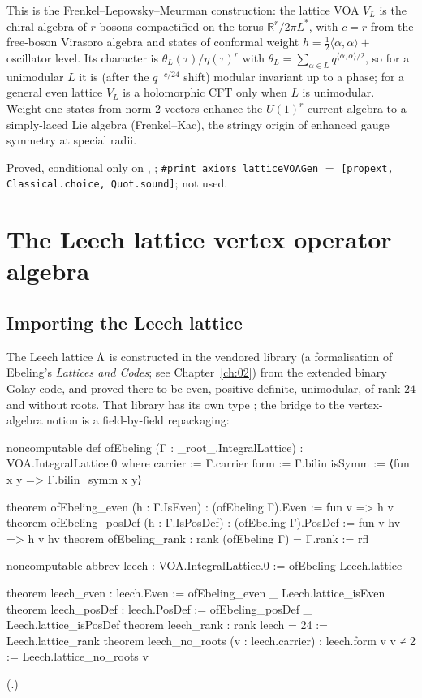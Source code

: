 \begin{physics}
This is the Frenkel--Lepowsky--Meurman construction: the lattice VOA $V_L$ is the chiral algebra of $r$ bosons compactified on the torus $\mathbb R^r/2\pi L^*$, with $c=r$ from the free-boson Virasoro algebra and states of conformal weight $h=\frac12\langle\alpha,\alpha\rangle+$ oscillator level. Its character is $\theta_L(\tau)/\eta(\tau)^r$ with $\theta_L=\sum_{\alpha\in L}q^{\langle\alpha,\alpha\rangle/2}$, so for a unimodular $L$ it is (after the $q^{-c/24}$ shift) modular invariant up to a phase; for a general even lattice $V_L$ is a holomorphic CFT only when $L$ is unimodular. Weight-one states from norm-$2$ vectors enhance the $U(1)^r$ current algebra to a simply-laced Lie algebra (Frenkel--Kac), the stringy origin of enhanced gauge symmetry at special radii.
\end{physics}

\begin{status}
Proved, conditional only on , ;
\texttt{\#print axioms latticeVOAGen} $=$ \texttt{[propext, Classical.choice, Quot.sound]};
 not used.
\end{status}

\section{The Leech lattice vertex operator algebra}\label{ch03:sec:leech}

\subsection{Importing the Leech lattice}

The Leech lattice ${\Lambda}$ is constructed in the vendored library
 (a formalisation of Ebeling's \emph{Lattices and Codes}; see
Chapter~\ref{ch:02}) from the extended binary Golay code, and proved there to be even,
positive-definite, unimodular, of rank $24$ and without roots. That library has its own type
; the bridge to the vertex-algebra notion is a field-by-field
repackaging:
\begin{leancode}
noncomputable def ofEbeling (Γ : _root_.IntegralLattice) : VOA.IntegralLattice.{0} where
  carrier := Γ.carrier
  form := Γ.bilin
  isSymm := ⟨fun x y => Γ.bilin_symm x y⟩

theorem ofEbeling_even (h : Γ.IsEven) : (ofEbeling Γ).Even := fun v => h v
theorem ofEbeling_posDef (h : Γ.IsPosDef) : (ofEbeling Γ).PosDef := fun v hv => h v hv
theorem ofEbeling_rank : rank (ofEbeling Γ) = Γ.rank := rfl

noncomputable abbrev leech : VOA.IntegralLattice.{0} := ofEbeling Leech.lattice

theorem leech_even : leech.Even := ofEbeling_even _ Leech.lattice_isEven
theorem leech_posDef : leech.PosDef := ofEbeling_posDef _ Leech.lattice_isPosDef
theorem leech_rank : rank leech = 24 := Leech.lattice_rank
theorem leech_no_roots (v : leech.carrier) : leech.form v v ≠ 2 := Leech.lattice_no_roots v
\end{leancode}
(.)

